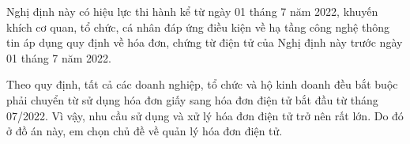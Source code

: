 Nghị định này có hiệu lực thi hành kể từ ngày 01 tháng 7 năm 2022, khuyến khích cơ quan, tổ chức, cá nhân đáp ứng điều kiện về hạ tầng công nghệ thông tin áp dụng quy định về hóa đơn, chứng từ điện tử của Nghị định này trước ngày 01 tháng 7 năm 2022.


Theo quy định, tất cả các doanh nghiệp, tổ chức và hộ kinh doanh đều bắt buộc phải chuyển từ sử dụng hóa đơn giấy sang hóa đơn điện tử bắt đầu từ tháng 07/2022. Vì vậy, nhu cầu sử dụng và xử lý hóa đơn điện tử trở nên rất lớn. Do đó ở đồ án này, em chọn chủ đề về quản lý hóa đơn điện tử.